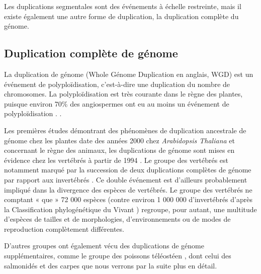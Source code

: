 \par Les duplications segmentales sont des événements à échelle restreinte, mais il existe également une autre forme de duplication, la duplication complète du génome.


\subsection{Duplication complète de génome}\label{wgd}
\par La duplication de génome (Whole Génome Duplication en anglais, WGD) est un événement de polyploïdisation, c’est-à-dire une duplication du nombre de chromosomes. La polyploïdisation est très courante dans le règne des plantes, puisque environ 70\% des angiospermes ont eu au moins un événement de polyploïdisation \parencite{masterson_stomatal_1994, soltis_polyploidy_2009}.  . 
\par Les premières études démontrant des phénomènes de duplication ancestrale de génome chez les plantes date des années 2000 chez \textit{Arabidopsis Thaliana} \parencite{blanc_recent_2003, bowers_unravelling_2003, the_arabidopsis_genome_initiative_analysis_2000} et concernant le règne des animaux, les duplications de génome sont mises en évidence chez les vertébrés à partir de 1994 \parencite{holland_gene_1994, nakatani_reconstruction_2007}. Le groupe des vertébrés est notamment marqué par la succession de deux duplications complètes de génome par rapport aux invertébrés \parencite{dehal_two_2005}. Ce double événement est d’ailleurs probablement impliqué dans la divergence des espèces de vertébrés. Le groupe des vertébrés ne comptant « que » 72 000 espèces (contre environ 1 000 000 d’invertébrés d’après la Classification phylogénétique du Vivant \parencite{lecointre_classification_2016}) regroupe, pour autant, une multitude d’espèces de tailles et de morphologies, d’environnements ou de modes de reproduction complètement différentes.
\par D’autres groupes ont également vécu des duplications de génome supplémentaires, comme le groupe des poissons téléostéen \parencite{braasch_polyploidy_2012, meyer_2r_2005}, dont celui des salmonidés et des carpes \parencite{lien_atlantic_2016, xu_allotetraploid_2019} que nous verrons par la suite plus en détail. 
